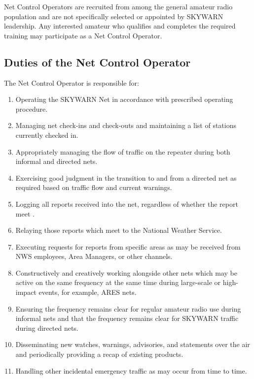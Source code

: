 \documentclass[pdflatex,letterpaper,twoside,12pt]{book}
\begin{document}
Net Control Operators are recruited from among the general amateur radio population and are not specifically selected or appointed by SKYWARN leadership.  Any interested amateur who qualifies and completes the required training may participate as a Net Control Operator.

\subsection{Duties of the Net Control Operator}\label{nco-duties}

The Net Control Operator is responsible for:

\begin{enumerate}
\item Operating the SKYWARN Net in accordance with prescribed operating procedure.
\item Managing net check-ins and check-outs and maintaining a list of stations currently checked in.
\item Appropriately managing the flow of traffic on the repeater during both informal and directed nets.
\item Exercising good judgment in the transition to and from a directed net as required based on traffic flow and current warnings.
\item Logging all reports received into the net, regardless of whether the report meet .
\item Relaying those reports which meet  to the National Weather Service.
\item Executing requests for reports from specific areas as may be received from NWS employees, Area Managers, or other channels.
\item Constructively and creatively working alongside other nets which may be active on the same frequency at the same time during large-scale or high-impact events, for example, ARES nets.
\item Ensuring the frequency remains clear for regular amateur radio use during informal nets and that the frequency remains clear for SKYWARN traffic during directed nets.
\item Disseminating new watches, warnings, advisories, and statements over the air and periodically providing a recap of existing products.
\item Handling other incidental emergency traffic as may occur from time to time.
\end{enumerate}
\end{document}
